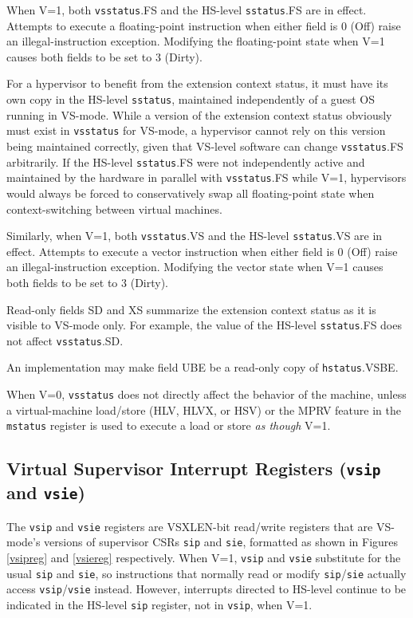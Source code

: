 When V=1, both {\tt vsstatus}.FS and the HS-level {\tt sstatus}.FS are in
effect.  Attempts
to execute a floating-point instruction when either field is 0 (Off) raise an
illegal-instruction exception.  Modifying the floating-point state when V=1
causes both fields to be set to 3 (Dirty).

\begin{commentary}
For a hypervisor to benefit from the extension context status, it must
have its own copy in the HS-level {\tt sstatus}, maintained independently
of a guest OS running in VS-mode.
While a version of the extension context status obviously must exist in
{\tt vsstatus} for VS-mode, a hypervisor cannot rely on this version
being maintained correctly, given that VS-level software can change
{\tt vsstatus}.FS arbitrarily.
If the HS-level {\tt sstatus}.FS were not independently active and
maintained by the hardware in parallel with {\tt vsstatus}.FS while V=1,
hypervisors would always be forced to conservatively swap all
floating-point state when context-switching between virtual machines.
\end{commentary}

Similarly, when V=1, both {\tt vsstatus}.VS and the HS-level {\tt sstatus}.VS
are in effect.
Attempts to execute a vector instruction when either field is 0 (Off) raise an
illegal-instruction exception.
Modifying the vector state when V=1 causes both fields to be set to 3 (Dirty).

Read-only fields SD and XS summarize the extension context status as it
is visible to VS-mode only.
For example, the value of the HS-level {\tt sstatus}.FS does not affect
{\tt vsstatus}.SD.

An implementation may make field UBE be a read-only copy of
{\tt hstatus}.VSBE.

When V=0, {\tt vsstatus} does not directly affect the behavior of the machine,
unless a virtual-machine load/store (HLV, HLVX, or HSV)
or the MPRV feature in the {\tt mstatus}
register is used to execute a load or store
{\em as though} V=1.

\subsection{Virtual Supervisor Interrupt Registers ({\tt vsip} and {\tt vsie})}

The {\tt vsip} and {\tt vsie} registers are VSXLEN-bit read/write
registers that are VS-mode's versions of supervisor CSRs {\tt sip} and
{\tt sie}, formatted as shown in Figures \ref{vsipreg} and \ref{vsiereg}
respectively.
When V=1, {\tt vsip} and {\tt vsie} substitute for the usual {\tt sip}
and {\tt sie}, so instructions that normally read or modify
{\tt sip}/{\tt sie} actually access {\tt vsip}/{\tt vsie} instead.
However, interrupts directed to HS-level continue to be
indicated in the HS-level {\tt sip} register, not in {\tt vsip}, when
V=1.

